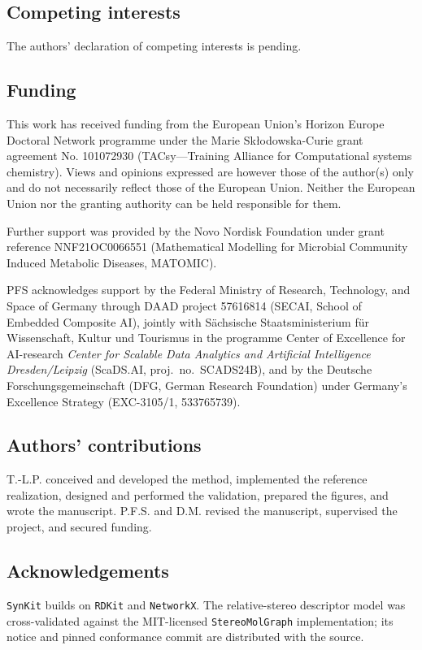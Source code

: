 \documentclass[pdflatex,sn-mathphys-num,referee,lineno]{sn-jnl}
\newcommand{\synkit}{\texttt{SynKit}\xspace}
\newcommand{\rdkit}{\texttt{RDKit}\xspace}
\newcommand{\networkx}{\texttt{NetworkX}\xspace}
\newcommand{\stereomolgraph}{\texttt{StereoMolGraph}\xspace}
\theoremstyle{plain}
\theoremstyle{remark}
\theoremstyle{definition}
\begin{document}
\subsection*{Competing interests}
The authors' declaration of competing interests is pending.

\subsection*{Funding}
This work has received funding from the European Union’s Horizon Europe
Doctoral Network programme under the Marie Sk{\l}odowska-Curie grant
agreement No. 101072930 (TACsy---Training Alliance for Computational
systems chemistry).  Views and opinions expressed are however those of the
author(s) only and do not necessarily reflect those of the European
Union. Neither the European Union nor the granting authority can be held
responsible for them.

Further support was provided by the Novo Nordisk Foundation under grant
reference NNF21OC0066551 (Mathematical Modelling for Microbial Community
Induced Metabolic Diseases, MATOMIC).

PFS acknowledges support by the Federal Ministry of Research, Technology,
and Space of Germany through DAAD project 57616814 (SECAI, School of
Embedded Composite AI), jointly with S{\"a}chsische Staatsministerium für
Wissenschaft, Kultur und Tourismus in the programme Center of Excellence
for AI-research \emph{Center for Scalable Data Analytics and Artificial
Intelligence Dresden/Leipzig} (ScaDS.AI, proj.\ no.\ SCADS24B), and by the
Deutsche Forschungsgemeinschaft (DFG, German Research Foundation) under
Germany's Excellence Strategy (EXC-3105/1, 533765739).

\subsection*{Authors' contributions}
T.-L.P. conceived and developed the method, implemented the reference
realization, designed and performed the validation, prepared the figures, and
wrote the manuscript.
P.F.S. and D.M. revised the manuscript, supervised the project, and secured
funding.

\subsection*{Acknowledgements}
\synkit builds on \rdkit and \networkx.  The relative-stereo descriptor model
was cross-validated against the MIT-licensed \stereomolgraph implementation;
its notice and pinned conformance commit are distributed with the source.



\end{document}
